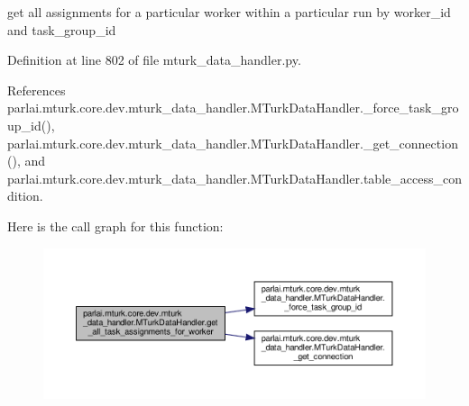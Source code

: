 \begin{DoxyVerb}get all assignments for a particular worker within a
particular run by worker_id and task_group_id
\end{DoxyVerb}
 

Definition at line 802 of file mturk\+\_\+data\+\_\+handler.\+py.



References parlai.\+mturk.\+core.\+dev.\+mturk\+\_\+data\+\_\+handler.\+M\+Turk\+Data\+Handler.\+\_\+force\+\_\+task\+\_\+group\+\_\+id(), parlai.\+mturk.\+core.\+dev.\+mturk\+\_\+data\+\_\+handler.\+M\+Turk\+Data\+Handler.\+\_\+get\+\_\+connection(), and parlai.\+mturk.\+core.\+dev.\+mturk\+\_\+data\+\_\+handler.\+M\+Turk\+Data\+Handler.\+table\+\_\+access\+\_\+condition.

Here is the call graph for this function\+:
\nopagebreak
\begin{figure}[H]
\begin{center}
\leavevmode
\includegraphics[width=350pt]{classparlai_1_1mturk_1_1core_1_1dev_1_1mturk__data__handler_1_1MTurkDataHandler_a7d86983e9f01a1f785284bbda21a2860_cgraph}
\end{center}
\end{figure}
\mbox{\label{classparlai_1_1mturk_1_1core_1_1dev_1_1mturk__data__handler_1_1MTurkDataHandler_a497bab989cb0979d44136b232a99f9a7}} 
